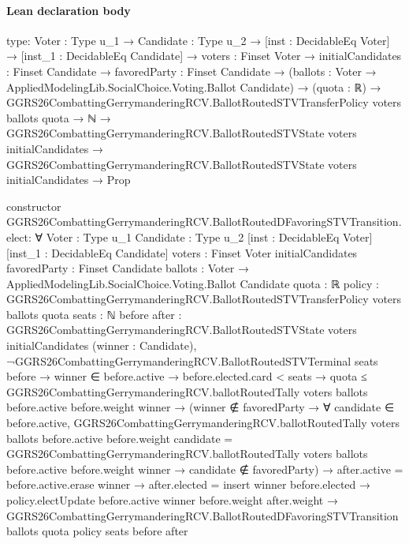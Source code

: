 \documentclass[10pt]{article}
\begin{document}
\paragraph{Lean declaration body}
\begin{ReviewVerbatim}
type:
{Voter : Type u_1} →
  {Candidate : Type u_2} →
    [inst : DecidableEq Voter] →
      [inst_1 : DecidableEq Candidate] →
        {voters : Finset Voter} →
          {initialCandidates : Finset Candidate} →
            {favoredParty : Finset Candidate} →
              (ballots : Voter → AppliedModelingLib.SocialChoice.Voting.Ballot Candidate) →
                (quota : ℝ) →
                  GGRS26CombattingGerrymanderingRCV.BallotRoutedSTVTransferPolicy voters ballots quota →
                    ℕ →
                      GGRS26CombattingGerrymanderingRCV.BallotRoutedSTVState voters initialCandidates →
                        GGRS26CombattingGerrymanderingRCV.BallotRoutedSTVState voters initialCandidates → Prop

constructor GGRS26CombattingGerrymanderingRCV.BallotRoutedDFavoringSTVTransition.elect:
∀ {Voter : Type u_1} {Candidate : Type u_2} [inst : DecidableEq Voter] [inst_1 : DecidableEq Candidate]
  {voters : Finset Voter} {initialCandidates favoredParty : Finset Candidate}
  {ballots : Voter → AppliedModelingLib.SocialChoice.Voting.Ballot Candidate} {quota : ℝ}
  {policy : GGRS26CombattingGerrymanderingRCV.BallotRoutedSTVTransferPolicy voters ballots quota} {seats : ℕ}
  {before after : GGRS26CombattingGerrymanderingRCV.BallotRoutedSTVState voters initialCandidates} (winner : Candidate),
  ¬GGRS26CombattingGerrymanderingRCV.BallotRoutedSTVTerminal seats before →
    winner ∈ before.active →
      before.elected.card < seats →
        quota ≤ GGRS26CombattingGerrymanderingRCV.ballotRoutedTally voters ballots before.active before.weight winner →
          (winner ∉ favoredParty →
              ∀ candidate ∈ before.active,
                GGRS26CombattingGerrymanderingRCV.ballotRoutedTally voters ballots before.active before.weight
                      candidate =
                    GGRS26CombattingGerrymanderingRCV.ballotRoutedTally voters ballots before.active before.weight
                      winner →
                  candidate ∉ favoredParty) →
            after.active = before.active.erase winner →
              after.elected = insert winner before.elected →
                policy.electUpdate before.active winner before.weight after.weight →
                  GGRS26CombattingGerrymanderingRCV.BallotRoutedDFavoringSTVTransition ballots quota policy seats before
                    after


\end{ReviewVerbatim}
\end{document}
